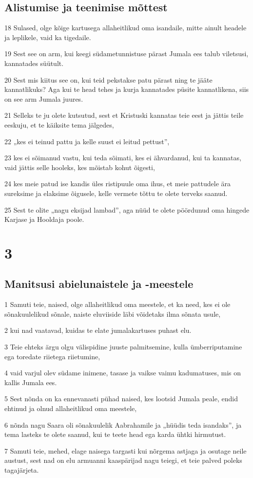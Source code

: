 \section*{Alistumise ja teenimise mõttest}

\par 18 Sulased, olge kõige kartusega allaheitlikud oma isandaile, mitte ainult headele ja leplikele, vaid ka tigedaile.
\par 19 Sest see on arm, kui keegi südametunnistuse pärast Jumala ees talub viletsusi, kannatades süütult.
\par 20 Sest mis kiitus see on, kui teid pekstakse patu pärast ning te jääte kannatlikuks? Aga kui te head tehes ja kurja kannatades püsite kannatlikena, siis on see arm Jumala juures.
\par 21 Selleks te ju olete kutsutud, sest et Kristuski kannatas teie eest ja jättis teile eeskuju, et te käiksite tema jälgedes,
\par 22 „kes ei teinud pattu ja kelle suust ei leitud pettust”,
\par 23 kes ei sõimanud vastu, kui teda sõimati, kes ei ähvardanud, kui ta kannatas, vaid jättis selle hooleks, kes mõistab kohut õigesti,
\par 24 kes meie patud ise kandis üles ristipuule oma ihus, et meie pattudele ära sureksime ja elaksime õigusele, kelle vermete tõttu te olete terveks saanud.
\par 25 Sest te olite „nagu eksijad lambad”, aga nüüd te olete pöördunud oma hingede Karjase ja Hooldaja poole.


\chapter{3}

\section*{Manitsusi abielunaistele ja -meestele}

\par 1 Samuti teie, naised, olge allaheitlikud oma meestele, et ka need, kes ei ole sõnakuulelikud sõnale, naiste eluviiside läbi võidetaks ilma sõnata usule,
\par 2 kui nad vaatavad, kuidas te elate jumalakartuses puhast elu.
\par 3 Teie ehteks ärgu olgu välispidine juuste palmitsemine, kulla ümberriputamine ega toredate riietega riietumine,
\par 4 vaid varjul olev südame inimene, tasase ja vaikse vaimu kadumatuses, mis on kallis Jumala ees.
\par 5 Sest nõnda on ka ennevanasti pühad naised, kes lootsid Jumala peale, endid ehtinud ja olnud allaheitlikud oma meestele,
\par 6 nõnda nagu Saara oli sõnakuulelik Aabrahamile ja „hüüdis teda isandaks”, ja tema lasteks te olete saanud, kui te teete head ega karda ühtki hirmutust.
\par 7 Samuti teie, mehed, elage naisega targasti kui nõrgema astjaga ja osutage neile austust, sest nad on elu armuanni kaaspärijad nagu teiegi, et teie palved poleks tagajärjeta.


